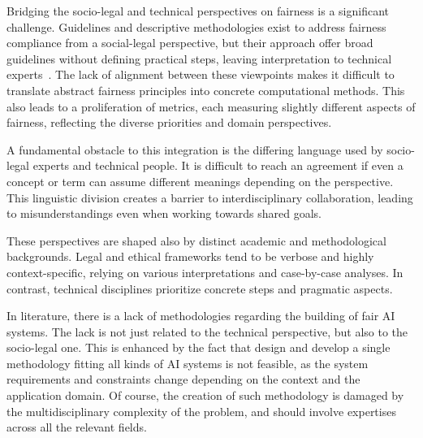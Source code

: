 \documentclass[12pt,a4paper,openright,twoside]{book}
\begin{document}
Bridging the socio-legal and technical perspectives on fairness is a significant challenge. 
%
Guidelines and descriptive methodologies exist to address fairness compliance from a social-legal perspective, but their approach offer broad guidelines without defining practical steps, leaving interpretation to technical experts~\cite{hicssfairness2025}.
%
The lack of alignment between these viewpoints makes it difficult to translate abstract fairness principles into concrete computational methods.
%
This also leads to a proliferation of metrics, each measuring slightly different aspects of fairness, reflecting the diverse priorities and domain perspectives.


A fundamental obstacle to this integration is the differing language used by socio-legal experts and technical people.
%
It is difficult to reach an agreement if even a concept or term can assume different meanings depending on the perspective.
This linguistic division creates a barrier to interdisciplinary collaboration, leading to misunderstandings even when working towards shared goals.



These perspectives are shaped also by distinct academic and methodological backgrounds.
%
Legal and ethical frameworks tend to be verbose and highly context-specific, relying on various interpretations and case-by-case analyses.
%
In contrast, technical disciplines prioritize concrete steps and pragmatic aspects.


In literature, there is a lack of methodologies regarding the building of fair \ac{AI} systems.
%
The lack is not just related to the technical perspective, but also to the socio-legal one.
%
This is enhanced by the fact that design and develop a single methodology fitting all kinds of \ac{AI} systems is not feasible, as the system requirements and constraints change depending on the context and the application domain.
%
Of course, the creation of such methodology is damaged by the multidisciplinary complexity of the problem, and should involve expertises across all the relevant fields.
\end{document}
